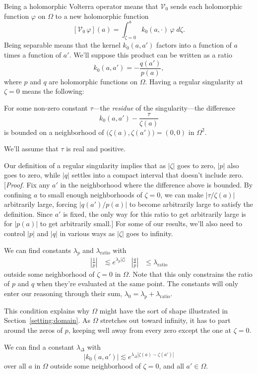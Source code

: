 \documentclass{article}
\makeatletter
\theoremstyle{plain}
\newcommand{\condconst}[2]{\item[($\text{\textsc{#1}} \mid #2$)]\protected@edef\@currentlabel{$\text{\textsc{#1}} \mid #2$}}
\newcommand{\hardpart}{\mathcal{V}_0}
\newcommand{\hardker}{k_0}
\newcommand{\domain}{\Omega}
\newenvironment{verify}{\color{ForestGreen}}{\color{black}}
\makeatother
\begin{document}
Being a holomorphic Volterra operator means that $\hardpart$ sends each holomorphic function $\varphi$ on $\domain$ to a new holomorphic function
\[ [\hardpart\,\varphi](a) = \int_{\zeta = 0}^a \hardker(a, \cdot)\,\varphi\;d\zeta. \]
Being separable means that the kernel $\hardker(a, a')$ factors into a function of $a$ times a function of $a'$. We'll suppose this product can be written as a ratio
\[ \hardker(a, a') = - \frac{q(a')}{p(a)}, \]
where $p$ and $q$ are holomorphic functions on $\domain$. Having a regular singularity at $\zeta = 0$ means the following:
\begin{conditions}
\condconst{sing}{\tau}\label{cond:sing} For some non-zero constant $\tau$---the {\em residue} of the singularity---the difference
\[ \hardker(a, a') - \frac{\tau}{\zeta(a)} \]
is bounded on a neighborhood of $\big(\zeta(a), \zeta(a')\big) = (0, 0)$ in $\domain^2$.
\end{conditions}
We'll assume that $\tau$ is real and positive.

Our definition of a regular singularity implies that as $|\zeta|$ goes to zero, $|p|$ also goes to zero, while $|q|$ settles into a compact interval that doesn't include zero.
\begin{verify}
[\textit{Proof.} Fix any $a'$ in the neighborhood where the difference above is bounded. By confining $a$ to small enough neighborhoods of $\zeta = 0$, we can make $|\tau/\zeta(a)|$ arbitrarily large, forcing $|q(a')/p(a)|$ to become arbitrarily large to satisfy the definition. Since $a'$ is fixed, the only way for this ratio to get arbitrarily large is for $|p(a)|$ to get arbitrarily small.]
\end{verify}
For some of our results, we'll also need to control $|p|$ and $|q|$ in various ways as $|\zeta|$ goes to infinity.
\begin{conditions}
\condconst{slow}{\lambda_0}\label{cond:slow} We can find constants $\lambda_p$ and $\lambda_\text{ratio}$ with
\begin{align*}
\left|\frac{1}{p}\right| & \lesssim e^{\lambda_p |\zeta|} &
\left|\frac{q}{p}\right| & \le \lambda_\text{ratio}
\end{align*}
outside some neighborhood of $\zeta = 0$ in $\Omega$. Note that this only constrains the ratio of $p$ and $q$ when they're evaluated at the same point. The constants will only enter our reasoning through their sum, $\lambda_0 = \lambda_p + \lambda_\text{ratio}$.
\end{conditions}
This condition explains why $\domain$ might have the sort of shape illustrated in Section~\ref{setting:domain}. As $\domain$ stretches out toward infinity, it has to part around the zeros of $p$, keeping well away from every zero except the one at $\zeta = 0$.
\begin{conditions}
\condconst{diag$_0$}{\lambda_\Delta}\label{cond:diag-basic} We can find a constant $\lambda_\Delta$ with
\[ \big| \hardker(a, a') \big| \lesssim e^{\lambda_\Delta|\zeta(a)-\zeta(a')|} \]
over all $a$ in $\domain$ outside some neighborhood of $\zeta = 0$, and all $a' \in \domain$.
\end{conditions}
\end{document}
